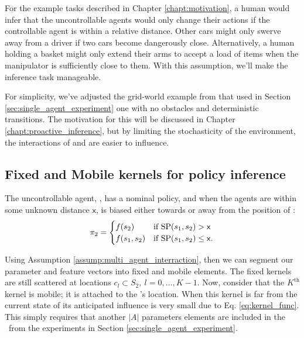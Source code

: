     For the example tasks described in Chapter \ref{chapt:motivation}, a human would infer that the uncontrollable
    agents would only change their actions if the controllable agent is within a relative distance. Other cars might
    only swerve away from a driver if two cars become dangerously close. Alternatively, a human holding a basket might
    only extend their arms to accept a load of items when the manipulator is sufficiently close to them. With this
    assumption, we'll make the inference task manageable.

    For simplicity, we've adjusted the grid-world example from that used in Section \ref{sec:single_agent_experiment}
    one with no obstacles and deterministic transitions. The motivation for this will be discussed in Chapter
    \ref{chapt:proactive_inference}, but by limiting the stochasticity of the environment, the interactions of 
    and  are easier to influence.

\subsection{Fixed and Mobile kernels for policy inference}\label{sec:fixed_and_mobile_kernels}

\begin{assumption}\label{assump:multi_agent_interraction}
        The uncontrollable agent, , has a nominal policy, and when the agents are within some unknown distance
        $\mathsf{x}$,  is biased either towards or away from the position of :
        \begin{align*}
        \pi_{2} & = \begin{cases}
        f(s_2) & \text{if}\ \textnormal{SP}(s_1,s_2) > \mathsf{x} \\
        f(s_1,s_2) & \text{if}\ \textnormal{SP}(s_1,s_2) \leq \mathsf{x}.
        \end{cases} \\
        \end{align*}
\end{assumption}

    Using Assumption \ref{assump:multi_agent_interraction}, then we can segment our parameter and feature vectors into
    fixed and mobile elements. The fixed kernels are still scattered at locations $c_l \subset S_2,\ l=0,\ldots,K-1$.
    Now, consider that the $K^{\text{th}}$ kernel is mobile; it is attached to the \!'s location. When this
    kernel is far from the current state of  its anticipated influence is very small due to Eq.
    \ref{eq:kernel_func}. This simply requires that another $|A|$ parameters elements are included in the \paramVec\
    from the experiments in Section \ref{sec:single_agent_experiment}.


